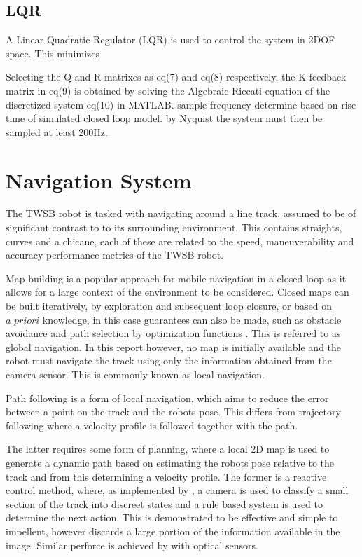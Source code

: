        \subsection{LQR}
        A Linear Quadratic Regulator (LQR) is used to control the system in 2DOF space.
        This minimizes 
        
       
        Selecting the Q and R matrixes as eq(7) and eq(8) respectively, 
        the K feedback matrix in eq(9) is obtained by solving the Algebraic Riccati
        equation of the discretized system eq(10) in MATLAB.
        sample frequency determine based on rise time of simulated closed loop model. 
        by Nyquist the system must then be sampled at least 200Hz. 

        \pagebreak{}
        \section{Navigation System}
        The TWSB robot is tasked with navigating around a line track, assumed to be of significant contrast to to its surrounding environment.
        This contains straights, curves and a chicane, each of these are related to the speed, maneuverability and accuracy
        performance metrics of the TWSB robot.

        Map building is a popular approach for mobile navigation in a closed loop as it allows for a large 
        context of the environment to be considered.  Closed maps can be built iteratively, by exploration 
        and subsequent loop closure, or based on $\textit{a priori}$ knowledge, in this case guarantees can also be made, 
        such as obstacle avoidance and path selection by optimization functions \cite{Macenski_2020}. This is referred to as global navigation.
        In this report however, no map is initially available and the robot must navigate the track using only
        the information obtained from the camera sensor. This is commonly known as local navigation.

        Path following is a form of local navigation, which aims to reduce the error between a point on the track 
        and the robots pose. This differs from trajectory following where a velocity profile is followed together with the path. 
              
        The latter requires some form of planning, where a local 2D map is used to generate a dynamic path based on estimating 
        the robots pose relative to the track and from this determining a velocity profile. The former is a reactive control
        method, where, as implemented by \cite{visionlinetwsb}, a camera is used to classify a small 
        section of the track into discreet states and a rule based system is used to determine the next action. This is demonstrated to be 
        effective and simple to impellent, however discards a large portion of the information available in the image. 
        Similar perforce is achieved by \cite{ghani2011two} with optical sensors. 

